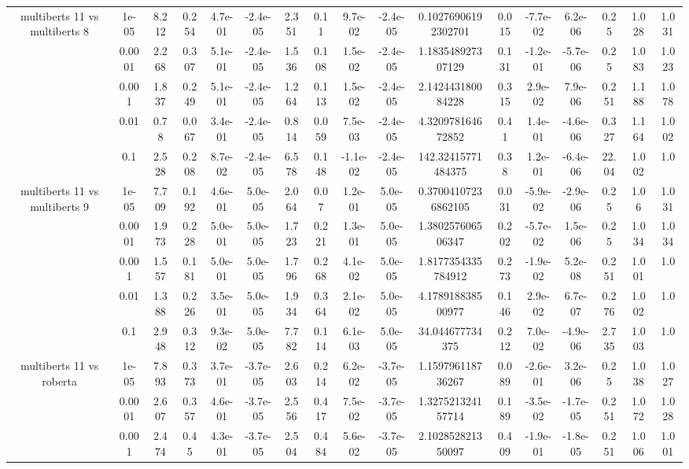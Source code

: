 \begin{tabular}{|c|c|c|c|c|c|c|c|c|c|c|c|c|c|c|c|c|}
\hline
\multirow{5}{*}{multiberts 11 vs multiberts 8} & 1e-05 & 8.212 & 0.254 & 4.7e-01 & -2.4e-05 & 2.351 & 0.11 & 9.7e-02 & -2.4e-05 & 0.10276906192302701 & 0.015 & -7.7e-02 & 6.2e-06 & 0.25 & 1.028 & 1.031 \\
 & 0.0001 & 2.268 & 0.307 & 5.1e-01 & -2.4e-05 & 1.536 & 0.108 & 1.5e-02 & -2.4e-05 & 1.183548927307129 & 0.131 & -1.2e-01 & -5.7e-06 & 0.25 & 1.083 & 1.023 \\
 & 0.001 & 1.837 & 0.249 & 5.1e-01 & -2.4e-05 & 1.264 & 0.113 & 1.5e-02 & -2.4e-05 & 2.142443180084228 & 0.315 & 2.9e-02 & 7.9e-06 & 0.251 & 1.188 & 1.078 \\
 & 0.01 & 0.78 & 0.067 & 3.4e-01 & -2.4e-05 & 0.814 & 0.059 & 7.5e-03 & -2.4e-05 & 4.320978164672852 & 0.41 & 1.4e-01 & -4.6e-06 & 0.327 & 1.164 & 1.002 \\
 & 0.1 & 2.528 & 0.208 & 8.7e-02 & -2.4e-05 & 6.578 & 0.148 & -1.1e-02 & -2.4e-05 & 142.32415771484375 & 0.38 & 1.2e-01 & -6.4e-06 & 22.04 & 1.002 & 1.0 \\
\hline
\multirow{5}{*}{multiberts 11 vs multiberts 9} & 1e-05 & 7.709 & 0.192 & 4.6e-01 & 5.0e-05 & 2.064 & 0.07 & 1.2e-01 & 5.0e-05 & 0.37004107236862105 & 0.031 & -5.9e-02 & -2.9e-06 & 0.25 & 1.06 & 1.031 \\
 & 0.0001 & 1.973 & 0.228 & 5.0e-01 & 5.0e-05 & 1.723 & 0.221 & 1.3e-01 & 5.0e-05 & 1.380257606506347 & 0.202 & -5.7e-02 & 1.5e-06 & 0.25 & 1.034 & 1.034 \\
 & 0.001 & 1.557 & 0.181 & 5.0e-01 & 5.0e-05 & 1.796 & 0.268 & 4.1e-02 & 5.0e-05 & 1.8177354335784912 & 0.273 & -1.9e-02 & 5.2e-08 & 0.251 & 1.001 & 1.0 \\
 & 0.01 & 1.388 & 0.226 & 3.5e-01 & 5.0e-05 & 1.934 & 0.364 & 2.1e-02 & 5.0e-05 & 4.178918838500977 & 0.146 & 2.9e-02 & 6.7e-07 & 0.276 & 1.002 & 1.0 \\
 & 0.1 & 2.948 & 0.312 & 9.3e-02 & 5.0e-05 & 7.782 & 0.114 & 6.1e-03 & 5.0e-05 & 34.044677734375 & 0.212 & 7.0e-02 & -4.9e-06 & 2.735 & 1.003 & 1.0 \\
\hline
\multirow{5}{*}{multiberts 11 vs roberta } & 1e-05 & 7.893 & 0.373 & 3.7e-01 & -3.7e-05 & 2.603 & 0.214 & 6.2e-02 & -3.7e-05 & 1.159796118736267 & 0.089 & -2.6e-01 & 3.2e-06 & 0.25 & 1.038 & 1.027 \\
 & 0.0001 & 2.607 & 0.357 & 4.6e-01 & -3.7e-05 & 2.556 & 0.417 & 7.5e-02 & -3.7e-05 & 1.327521324157714 & 0.189 & -3.5e-02 & -1.7e-05 & 0.251 & 1.072 & 1.028 \\
 & 0.001 & 2.474 & 0.45 & 4.3e-01 & -3.7e-05 & 2.504 & 0.484 & 5.6e-02 & -3.7e-05 & 2.102852821350097 & 0.409 & -1.9e-01 & -1.8e-05 & 0.251 & 1.006 & 1.001 \\

\end{tabular}
